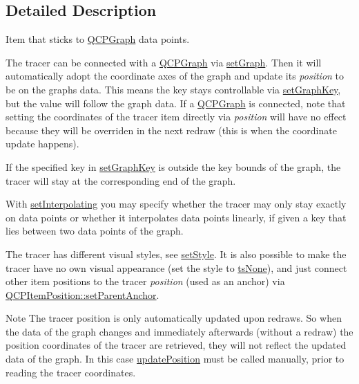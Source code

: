 \subsection{Detailed Description}
Item that sticks to \hyperlink{classQCPGraph}{Q\+C\+P\+Graph} data points. 

 The tracer can be connected with a \hyperlink{classQCPGraph}{Q\+C\+P\+Graph} via \hyperlink{classQCPItemTracer_af5886f4ded8dd68cb4f3388f390790c0}{set\+Graph}. Then it will automatically adopt the coordinate axes of the graph and update its {\itshape position} to be on the graph\textquotesingle{}s data. This means the key stays controllable via \hyperlink{classQCPItemTracer_a6840143b42f3b685cedf7c6d83a704c8}{set\+Graph\+Key}, but the value will follow the graph data. If a \hyperlink{classQCPGraph}{Q\+C\+P\+Graph} is connected, note that setting the coordinates of the tracer item directly via {\itshape position} will have no effect because they will be overriden in the next redraw (this is when the coordinate update happens).

If the specified key in \hyperlink{classQCPItemTracer_a6840143b42f3b685cedf7c6d83a704c8}{set\+Graph\+Key} is outside the key bounds of the graph, the tracer will stay at the corresponding end of the graph.

With \hyperlink{classQCPItemTracer_a6c244a9d1175bef12b50afafd4f5fcd2}{set\+Interpolating} you may specify whether the tracer may only stay exactly on data points or whether it interpolates data points linearly, if given a key that lies between two data points of the graph.

The tracer has different visual styles, see \hyperlink{classQCPItemTracer_a41a2ac4f1acd7897b4e2a2579c03204e}{set\+Style}. It is also possible to make the tracer have no own visual appearance (set the style to \hyperlink{classQCPItemTracer_a2f05ddb13978036f902ca3ab47076500aac27462c79146225bfa8fba24d2ee8a4}{ts\+None}), and just connect other item positions to the tracer {\itshape position} (used as an anchor) via \hyperlink{classQCPItemPosition_ac094d67a95d2dceafa0d50b9db3a7e51}{Q\+C\+P\+Item\+Position\+::set\+Parent\+Anchor}.

\begin{DoxyNote}{Note}
The tracer position is only automatically updated upon redraws. So when the data of the graph changes and immediately afterwards (without a redraw) the position coordinates of the tracer are retrieved, they will not reflect the updated data of the graph. In this case \hyperlink{classQCPItemTracer_a5b90296109e36384aedbc8908a670413}{update\+Position} must be called manually, prior to reading the tracer coordinates. 
\end{DoxyNote}


